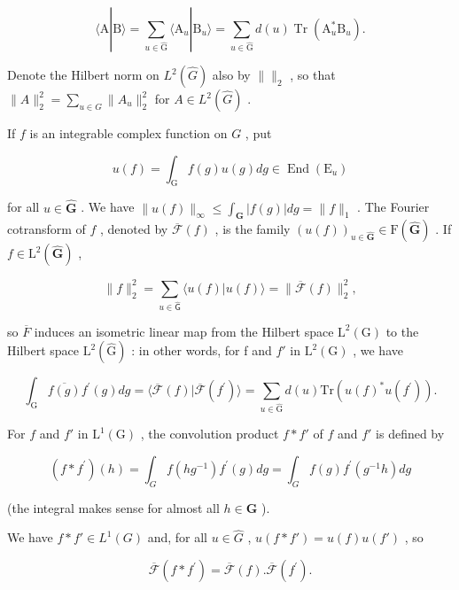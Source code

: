 \[
\langle \mathrm{A} | \mathrm{B} \rangle = \sum_ {u \in \hat {\mathrm{G}}} \langle \mathrm{A} _ {u} | \mathrm{B} _ {u} \rangle = \sum_ {u \in \hat {\mathrm{G}}} d (u) \operatorname{Tr} (\mathrm{A} _ {u} ^ {*} \mathrm{B} _ {u}).\tag{5}
\]

Denote the Hilbert norm on \(L^{2}(\hat{G})\) also by \(\parallel\parallel_{2}\) , so that \(\|A\|_{2}^{2}=\sum_{u\in\hat{G}}\|A_{u}\|_{2}^{2}\) for \(A\in L^{2}(\hat{G})\) .

If \(f\) is an integrable complex function on \(G\) , put

\[
u (f) = \int_ {\mathrm{G}} f (g) u (g) d g \in \operatorname{End} (\mathrm{E} _ {u})\tag{6}
\]

for all \(u \in \hat{\mathbf{G}}\) . We have \(\| u(f) \|_{\infty} \leq \int_{\mathbf{G}} |f(g)| dg = \| f \|_1\) . The Fourier cotransform of \(f\) , denoted by \(\overline{\mathcal{F}}(f)\) , is the family \((u(f))_{u \in \hat{\mathbf{G}}} \in \mathrm{F}(\hat{\mathbf{G}})\) . If \(f \in \mathrm{L}^2(\hat{\mathbf{G}})\) ,

\[
\| f \| _ {2} ^ {2} = \sum_ {u \in \hat {\mathsf {G}}} \langle u (f) | u (f) \rangle = \| \overline {{\mathcal {F}}} (f) \| _ {2} ^ {2},
\]

so \(\overline{F}\) induces an isometric linear map from the Hilbert space \(\mathrm{L}^{2}(\mathrm{G})\) to the Hilbert space \(\mathrm{L}^{2}(\hat{\mathrm{G}})\) : in other words, for f and \(f'\) in \(\mathrm{L}^{2}(\mathrm{G})\) , we have

\[
\int_ {\mathrm{G}} \overline {{f (g)}} f ^ {\prime} (g) d g = \langle \overline {{\mathcal {F}}} (f) | \overline {{\mathcal {F}}} (f ^ {\prime}) \rangle = \sum_ {u \in \hat {\mathrm{G}}} d (u) \mathrm{Tr} (u (f) ^ {*} u (f ^ {\prime})).\tag{7}
\]

For \(f\) and \(f'\) in \(\mathrm{L}^1(\mathrm{G})\) , the convolution product \(f * f'\) of \(f\) and \(f'\) is defined by

\[
(f * f ^ {\prime}) (h) = \int_ {G} f (h g ^ {- 1}) f ^ {\prime} (g) d g = \int_ {G} f (g) f ^ {\prime} (g ^ {- 1} h) d g
\]

(the integral makes sense for almost all \(h \in \mathbf{G}\) ).

We have \(f * f' \in L^{1}(G)\) and, for all \(u \in \hat{G}\) , \(u(f * f') = u(f)u(f')\) , so

\[
\overline {{{{\mathcal {F}}}}} (f * f ^ {\prime}) = \overline {{{{\mathcal {F}}}}} (f). \overline {{{{\mathcal {F}}}}} (f ^ {\prime}).\tag{8}
\]

